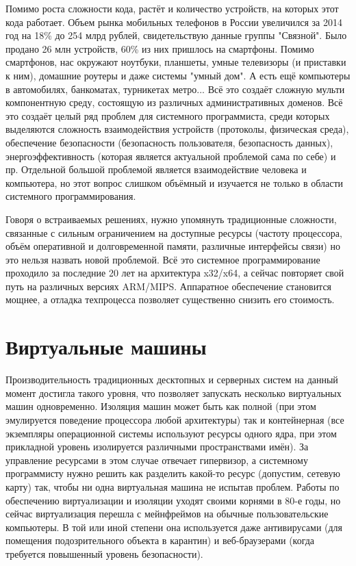 \documentclass[a4paper, 12pt]{article} %
\begin{document}
Помимо роста сложности кода, растёт и количество устройств, на которых этот кода работает. Объем рынка мобильных телефонов в России увеличился за 2014 год на 18\% до 254 млрд рублей, свидетельствую данные группы "Связной". Было продано 26 млн устройств, 60\% из них пришлось на смартфоны. Помимо смартфонов, нас окружают ноутбуки, планшеты, умные телевизоры (и приставки к ним), домашние роутеры и даже системы "умный дом". А есть ещё компьютеры в автомобилях, банкоматах, турникетах метро... Всё это создаёт сложную мульти компонентную среду, состоящую из различных административных доменов. Всё это создаёт целый ряд проблем для системного программиста, среди которых выделяются сложность взаимодействия устройств (протоколы, физическая среда), обеспечение безопасности (безопасность пользователя, безопасность данных), энергоэффективность (которая является актуальной проблемой сама по себе) и пр. Отдельной большой проблемой является взаимодействие человека и компьютера, но этот вопрос слишком объёмный и изучается не только в области системного программирования.


Говоря о встраиваемых решениях, нужно упомянуть традиционные сложности, связанные с сильным ограничением на доступные ресурсы (частоту процессора, объём оперативной и долговременной памяти, различные интерфейсы связи) но это нельзя назвать новой проблемой. Всё это системное программирование проходило за последние 20 лет на архитектура x32/x64, а сейчас повторяет свой путь на различных версиях ARM/MIPS. Аппаратное обеспечение становится мощнее, а отладка техпроцесса позволяет существенно снизить его стоимость.


\section*{Виртуальные машины}

Производительность традиционных десктопных и серверных систем на данный момент достигла такого уровня, что позволяет запускать несколько виртуальных машин одновременно. Изоляция машин может быть как полной (при этом эмулируется поведение процессора любой архитектуры) так и контейнерная (все экземпляры операционной системы используют ресурсы одного ядра, при этом прикладной уровень изолируется различными пространствами имён). За управление ресурсами в этом случае отвечает гипервизор, а системному программисту нужно решить как разделить какой-то ресурс (допустим, сетевую карту) так, чтобы ни одна виртуальная машина не испытав проблем. Работы по обеспечению виртуализации и изоляции уходят своими корнями в 80-е годы, но сейчас виртуализация перешла с мейнфреймов на обычные пользовательские компьютеры. В той или иной степени она используется даже антивирусами (для помещения подозрительного объекта в карантин) и веб-браузерами (когда требуется повышенный уровень безопасности).
\end{document}
